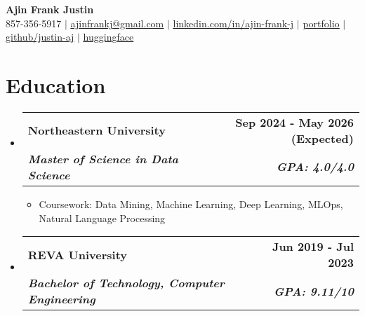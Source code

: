 \documentclass[letterpaper,11pt]{article}
\makeatletter
\newcommand{\resumeItem}[1]{
  \item\small{
    {#1 \vspace{-2pt}}
  }
}
\newcommand{\resumeSubheading}[4]{
  \vspace{-2pt}\item
    \begin{tabular*}{0.97\textwidth}[t]{l@{\extracolsep{\fill}}r}
      \textbf{#1} & #2 \\
      \textit{\small#3} & \textit{\small #4} \\
    \end{tabular*}\vspace{-7pt}
}
\newcommand{\resumeSubHeadingListStart}{\begin{itemize}[leftmargin=0.15in, label={}]}
\newcommand{\resumeSubHeadingListEnd}{\end{itemize}}
\newcommand{\resumeItemListStart}{\begin{itemize}}
\newcommand{\resumeItemListEnd}{\end{itemize}\vspace{-5pt}}
\makeatother
\begin{document}
\begin{center}
    \textbf{\Huge Ajin Frank Justin} \\
    \vspace{1pt}
    857-356-5917 $|$ 
    \href{mailto:ajinfrankj@gmail.com}{\underline{ajinfrankj@gmail.com}} $|$ 
    \href{https://www.linkedin.com/in/ajin-frank-j/}{\underline{linkedin.com/in/ajin-frank-j}} $|$ 
    \href{https://ajinfrankjustin.sites.northeastern.edu/}{\underline{portfolio}} $|$ 
    \href{https://github.com/justin-aj}{\underline{github/justin-aj}} $|$ 
    \href{https://huggingface.co/justin-aj}{\underline{huggingface}}
    
\end{center}

\vspace{-15pt}  %

\section{Education}
\resumeSubHeadingListStart
\resumeSubheading
{Northeastern University}{\textbf{Sep 2024 - May 2026 (Expected)}}
{\normalfont \textbf{Master of Science in Data Science}}
{\normalfont \textbf{GPA: 4.0/4.0}}
\resumeItemListStart
    \resumeItem{Coursework: Data Mining, Machine Learning, Deep Learning, MLOps, Natural Language Processing}
\resumeItemListEnd

\vspace{-1pt}  %

\resumeSubheading
{REVA University}{\textbf{Jun 2019 - Jul 2023}}
{\normalfont \textbf{Bachelor of Technology, Computer Engineering}}{\normalfont \textbf{GPA: 9.11/10}}
\resumeSubHeadingListEnd

\vspace{-10pt}  %

\end{document}
